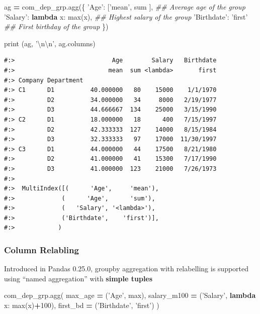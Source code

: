\documentclass[
]{book}
\newenvironment{Shaded}{\begin{snugshade}}{\end{snugshade}}
\newcommand{\BuiltInTok}[1]{#1}
\newcommand{\CharTok}[1]{\textcolor[rgb]{0.5,0.5,0.5}{#1}}
\newcommand{\CommentTok}[1]{\textcolor[rgb]{0.37,0.37,0.37}{\textit{#1}}}
\newcommand{\DecValTok}[1]{\textcolor[rgb]{0.06,0.06,0.06}{#1}}
\newcommand{\KeywordTok}[1]{\textcolor[rgb]{0.27,0.27,0.27}{\textbf{#1}}}
\newcommand{\NormalTok}[1]{#1}
\newcommand{\OperatorTok}[1]{\textcolor[rgb]{0.43,0.43,0.43}{\textbf{#1}}}
\newcommand{\StringTok}[1]{\textcolor[rgb]{0.5,0.5,0.5}{#1}}
\begin{document}
\begin{Shaded}
\begin{Highlighting}[]
\NormalTok{ag }\OperatorTok{=}\NormalTok{ com_dep_grp.agg(\{}
      \StringTok{'Age'}\NormalTok{: [}\StringTok{'mean'}\NormalTok{, }\BuiltInTok{sum}\NormalTok{ ],       }\CommentTok{## Average age of the group}
      \StringTok{'Salary'}\NormalTok{: }\KeywordTok{lambda}\NormalTok{ x: }\BuiltInTok{max}\NormalTok{(x),  }\CommentTok{## Highest salary of the group}
      \StringTok{'Birthdate'}\NormalTok{: }\StringTok{'first'}         \CommentTok{## First birthday of the group}
\NormalTok{    \})}
    
\BuiltInTok{print}\NormalTok{ (ag, }\StringTok{'}\CharTok{\textbackslash{}n\textbackslash{}n}\StringTok{'}\NormalTok{, ag.columns)}
\end{Highlighting}
\end{Shaded}

\begin{verbatim}
#:>                           Age        Salary   Birthdate
#:>                          mean  sum <lambda>       first
#:> Company Department                                     
#:> C1      D1          40.000000   80    15000    1/1/1970
#:>         D2          34.000000   34     8000   2/19/1977
#:>         D3          44.666667  134    25000   3/15/1990
#:> C2      D1          18.000000   18      400   7/15/1997
#:>         D2          42.333333  127    14000   8/15/1984
#:>         D3          32.333333   97    17000  11/30/1997
#:> C3      D1          44.000000   44    17500   8/21/1980
#:>         D2          41.000000   41    15300   7/17/1990
#:>         D3          41.000000  123    21000   7/26/1973 
#:> 
#:>  MultiIndex([(      'Age',     'mean'),
#:>             (      'Age',      'sum'),
#:>             (   'Salary', '<lambda>'),
#:>             ('Birthdate',    'first')],
#:>            )
\end{verbatim}

\hypertarget{column-relabling}{%
\subsubsection{Column Relabling}\label{column-relabling}}

Introduced in Pandas 0.25.0, groupby aggregation with relabelling is supported using ``named aggregation'' with \textbf{simple tuples}

\begin{Shaded}
\begin{Highlighting}[]
\NormalTok{com_dep_grp.agg(}
\NormalTok{  max_age     }\OperatorTok{=}\NormalTok{ (}\StringTok{'Age'}\NormalTok{, }\BuiltInTok{max}\NormalTok{),}
\NormalTok{  salary_m100 }\OperatorTok{=}\NormalTok{ (}\StringTok{'Salary'}\NormalTok{,  }\KeywordTok{lambda}\NormalTok{ x: }\BuiltInTok{max}\NormalTok{(x)}\OperatorTok{+}\DecValTok{100}\NormalTok{),  }
\NormalTok{  first_bd    }\OperatorTok{=}\NormalTok{ (}\StringTok{'Birthdate'}\NormalTok{, }\StringTok{'first'}\NormalTok{)}
\NormalTok{)}
\end{Highlighting}
\end{Shaded}
\end{document}
